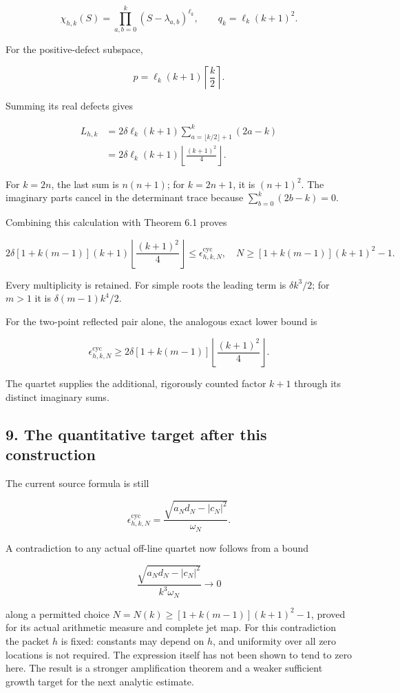 \[
\boxed{
\chi_{h,k}(S)=\prod_{a,b=0}^k(S-\lambda_{a,b})^{\ell_k},
\qquad q_k=\ell_k(k+1)^2.
}
\]

For the positive-defect subspace,

\[
p=\ell_k(k+1)\left\lceil\frac k2\right\rceil.
\]

Summing its real defects gives

\[
\begin{aligned}
L_{h,k}
&=2\delta\ell_k(k+1)
\sum_{a=\lfloor k/2\rfloor+1}^{k}(2a-k)\\
&=2\delta\ell_k(k+1)
\left\lfloor\frac{(k+1)^2}{4}\right\rfloor.
\end{aligned}
\]

For \(k=2n\), the last sum is \(n(n+1)\); for \(k=2n+1\), it is
\((n+1)^2\). The imaginary parts cancel in the determinant trace because
\(\sum_{b=0}^k(2b-k)=0\).

Combining this calculation with Theorem 6.1 proves

\[
\boxed{
2\delta[1+k(m-1)](k+1)
\left\lfloor\frac{(k+1)^2}{4}\right\rfloor
\leq\epsilon_{h,k,N}^{\mathrm{cyc}},
\quad N\geq[1+k(m-1)](k+1)^2-1.
}
\]

Every multiplicity is retained. For simple roots the leading term is
\(\delta k^3/2\); for \(m>1\) it is \(\delta(m-1)k^4/2\).

For the two-point reflected pair alone, the analogous exact lower bound
is

\[
\epsilon_{h,k,N}^{\mathrm{cyc}}
\geq2\delta[1+k(m-1)]
\left\lfloor\frac{(k+1)^2}{4}\right\rfloor.
\]

The quartet supplies the additional, rigorously counted factor \(k+1\)
through its distinct imaginary sums.

\subsection{9. The quantitative target after this
construction}\label{exterior_trace:the-quantitative-target-after-this-construction}

The current source formula is still

\[
\epsilon_{h,k,N}^{\mathrm{cyc}}
=\frac{\sqrt{a_Nd_N-|c_N|^2}}{\omega_N}.
\]

A contradiction to any actual off-line quartet now follows from a bound

\[
\boxed{
\frac{\sqrt{a_Nd_N-|c_N|^2}}{k^3\omega_N}\longrightarrow0
}
\]

along a permitted choice \(N=N(k)\geq[1+k(m-1)](k+1)^2-1\), proved for
its actual arithmetic measure and complete jet map. For this
contradiction the packet \(h\) is fixed: constants may depend on \(h\),
and uniformity over all zero locations is not required. The expression
itself has not been shown to tend to zero here. The result is a stronger
amplification theorem and a weaker sufficient growth target for the next
analytic estimate.

